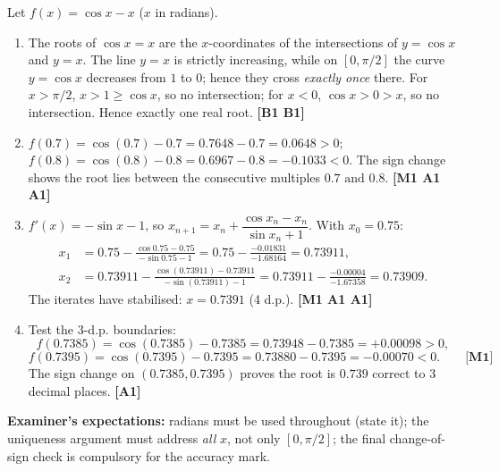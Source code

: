 \documentclass[11pt]{article}
\begin{document}
\begin{corrige}[Exercise 10 — GCE-style: $\cos x = x$]
Let $f(x) = \cos x - x$ ($x$ in radians).
\begin{enumerate}
\item The roots of $\cos x = x$ are the $x$-coordinates of the intersections of $y = \cos x$ and $y = x$. The line $y = x$ is strictly increasing, while on $[0, \pi/2]$ the curve $y = \cos x$ decreases from $1$ to $0$; hence they cross \emph{exactly once} there. For $x > \pi/2$, $x > 1 \geq \cos x$, so no intersection; for $x < 0$, $\cos x > 0 > x$, so no intersection. Hence exactly one real root. \hfill \textbf{[B1 B1]}
\item $f(0.7) = \cos(0.7) - 0.7 = 0.7648 - 0.7 = 0.0648 > 0$;
$f(0.8) = \cos(0.8) - 0.8 = 0.6967 - 0.8 = -0.1033 < 0$.
The sign change shows the root lies between the consecutive multiples $\boxed{0.7 \text{ and } 0.8}$. \hfill \textbf{[M1 A1 A1]}
\item $f'(x) = -\sin x - 1$, so $x_{n+1} = x_{n} + \dfrac{\cos x_{n} - x_{n}}{\sin x_{n} + 1}$. With $x_{0} = 0.75$:
\begin{align*}
x_{1} &= 0.75 - \frac{\cos 0.75 - 0.75}{-\sin 0.75 - 1} = 0.75 - \frac{-0.01831}{-1.68164} = 0.73911,\\
x_{2} &= 0.73911 - \frac{\cos(0.73911) - 0.73911}{-\sin(0.73911) - 1} = 0.73911 - \frac{-0.00004}{-1.67358} = 0.73909.
\end{align*}
The iterates have stabilised: $x = 0.7391$ (4 d.p.). \hfill \textbf{[M1 A1 A1]}
\item Test the $3$-d.p. boundaries:
\[ f(0.7385) = \cos(0.7385) - 0.7385 = 0.73948 - 0.7385 = +0.00098 > 0, \]
\[ f(0.7395) = \cos(0.7395) - 0.7395 = 0.73880 - 0.7395 = -0.00070 < 0. \qquad \textbf{[M1]} \]
The sign change on $(0.7385, 0.7395)$ proves the root is $0.739$ correct to $3$ decimal places. \hfill \textbf{[A1]}
\end{enumerate}
\textbf{Examiner's expectations:} radians must be used throughout (state it); the uniqueness argument must address \emph{all} $x$, not only $[0, \pi/2]$; the final change-of-sign check is compulsory for the accuracy mark.
\end{corrige}
\end{document}
